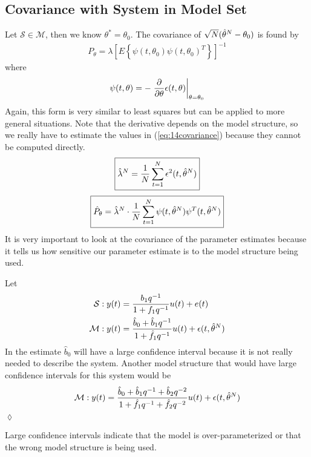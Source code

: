 \subsection{Covariance with System in Model Set}
\label{sec:varsinm}
Let $\mathcal{S}\in\mathcal{M}$, then we know $\theta^\ast=\theta_0$.
The covariance of $\sqrt{N}(\hat{\theta}^N-\theta_0)$ is found by
\begin{align}
\label{eq:14covariance}
\boxed{P_\theta = \lambda{\left[E\left\lbrace \psi(t,\theta_0)\psi{(t,\theta_0)}^T\right\rbrace\right]}^{-1}}
\end{align}
where
$$\psi(t,\theta) = -\left.\frac{\partial}{\partial\theta}\epsilon(t,\theta)\right|_{\theta=\theta_0}$$
Again, this form is very similar to least squares but can be applied to more general situations.
Note that the derivative depends on the model structure, so we really have to estimate the values in (\ref{eq:14covariance}) because they cannot be computed directly.
\begin{align*}
\boxed{\hat{\lambda}^N = \frac{1}{N}\sum_{t=1}^N\epsilon^2(t,\hat{\theta}^N)}
\end{align*}
\begin{align*}
\boxed{\hat{P}_\theta = \hat{\lambda}^N\cdot\frac{1}{N}\sum_{t=1}^N\psi(t,\hat{\theta}^N)\psi^T(t,\hat{\theta}^N)}
\end{align*}
It is very important to look at the covariance of the parameter estimates because it tells us how sensitive our parameter estimate is to the model structure being used.

\begin{example}
Let
\begin{align*}
\mathcal{S}: y(t) &= \frac{b_1q^{-1}}{1+f_1q^{-1}}u(t) + e(t) \\
\mathcal{M}: y(t) &= \frac{\hat{b}_0 + \hat{b}_1q^{-1}}{1+\hat{f}_1q^{-1}}u(t) + \epsilon(t,\hat{\theta}^N)
\end{align*}
In the estimate $\hat{b}_0$ will have a large confidence interval because it is not really needed to describe the system.
Another model structure that would have large confidence intervals for this system would be
$$\mathcal{M}: y(t) = \frac{\hat{b}_0+\hat{b}_1q^{-1}+\hat{b}_2q^{-2}}{1+\hat{f}_1q^{-1}+\hat{f}_2q^{-2}}u(t)+\epsilon(t,\hat{\theta}^N)$$
$\lozenge$
\end{example}

Large confidence intervals indicate that the model is over-parameterized or that the wrong model structure is being used.
